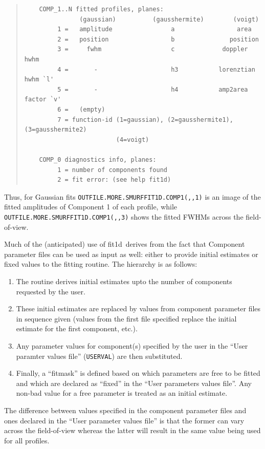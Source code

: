 \documentclass[twoside,11pt]{article}
\newcommand{\xref}[3]{#1}
\renewcommand{\_}{\texttt{\symbol{95}}}
\newenvironment{myquote}{\begin{quote}\begin{small}}{\end{small}\end{quote}}
\newcommand{\task}[1]{\textsf{#1}}
\newcommand{\fitdd}{\xref{\task{fit1d}}{sun258}{FIT1D}}
\newcommand{\aparam}[1]{\texttt{#1}}     %
\newcommand{\ndfcomp}[1]{\texttt{#1}}    %
\begin{document}
\begin{myquote}
\begin{verbatim}
    COMP_1..N fitted profiles, planes:
               (gaussian)          (gausshermite)        (voigt)
         1 =   amplitude                a                 area
         2 =   position                 b               position
         3 =     fwhm                   c             doppler hwhm
         4 =       -                    h3           lorenztian hwhm `l'
         5 =       -                    h4           amp2area factor `v'
         6 =   (empty)
         7 = function-id (1=gaussian), (2=gausshermite1), (3=gausshermite2)
                         (4=voigt)

    COMP_0 diagnostics info, planes:
         1 = number of components found
         2 = fit error: (see help fit1d)
\end{verbatim}
\end{myquote}

Thus, for Gaussian fits \ndfcomp{OUTFILE.MORE.SMURF\_FIT1D.COMP\_1(,,1)} is
an image of the fitted amplitudes of Component 1 of each profile,
while \ndfcomp{OUTFILE.MORE.SMURF\_FIT1D.COMP\_1(,,3)} shows the fitted FWHMs
across the field-of-view.

Much of the (anticipated) use of \fitdd\ derives from the fact that
Component parameter files can be used as input as well: either to
provide initial estimates or fixed values to the fitting routine.
The hierarchy is as follows:
\begin{enumerate}
\item The routine derives initial estimates upto the number of components
requested by the user.
\item These initial estimates are replaced by values from component parameter
files in sequence given (values from the first file specified replace
the initial estimate for the first component, etc.).
\item Any parameter values for component(s) specified by the user in
the ``User paramter values file'' (\aparam{USERVAL}) are then substituted.
\item Finally, a ``fitmask'' is defined based on which parameters are
free to be fitted and which are declared as ``fixed'' in the ``User
parameters values file''. Any non-bad value for a free parameter is treated
as an initial estimate.
\end{enumerate}

The difference between values specified in the component parameter
files and ones declared in the ``User parameter values file'' is that
the former can vary across the field-of-view whereas the latter will
result in the same value being used for all profiles.
\end{document}
